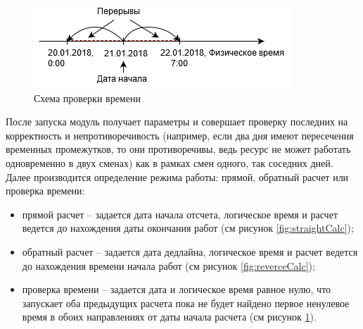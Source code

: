 \begin{figure}[h!]
	\centering
	\includegraphics[width=0.7\linewidth]{pics/scheduleCheckCalc.png}
	\caption{Схема проверки времени}
	\label{fig:checkCalc}
\end{figure}

\indent После запуска модуль получает параметры и совершает проверку последних на корректность и непротиворечивость (например, если два дня имеют пересечения временных промежутков, то они противоречивы, ведь ресурс не может работать одновременно в двух сменах) как в рамках смен одного, так соседних дней.
Далее производится определение режима работы: прямой, обратный расчет или проверка времени:

\begin{itemize}
	\item прямой расчет -- задается дата начала отсчета, логическое время и расчет ведется до нахождения даты окончания работ (см рисунок \ref{fig:straightCalc});
	\item обратный расчет -- задается дата дедлайна, логическое время и расчет ведется до нахождения времени начала работ (см рисунок \ref{fig:reverceCalc});
	\item проверка времени -- задается дата и логическое время равное нулю, что запускает оба предыдущих расчета пока не будет найдено первое ненулевое время в обоих направлениях от даты начала расчета (см рисунок \ref{fig:checkCalc}).
\end{itemize}

